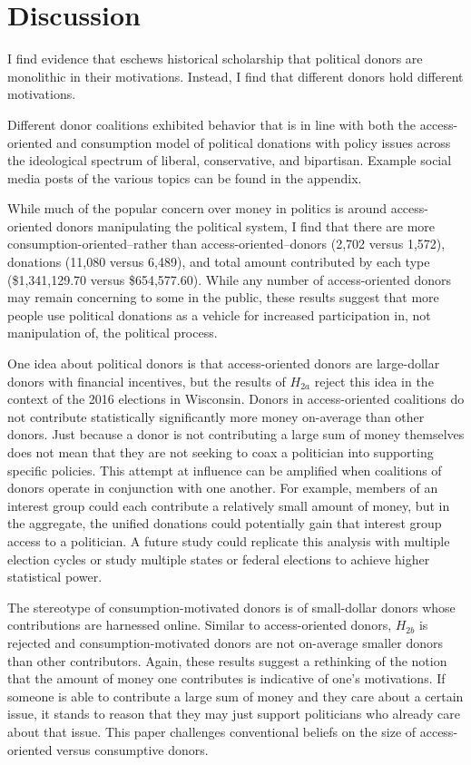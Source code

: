 \documentclass[12pt,]{article}
\begin{document}
\hypertarget{discussion}{%
\section{Discussion}\label{discussion}}

I find evidence that eschews historical scholarship that political
donors are monolithic in their motivations. Instead, I find that
different donors hold different motivations.

Different donor coalitions exhibited behavior that is in line with both
the access-oriented and consumption model of political donations with
policy issues across the ideological spectrum of liberal, conservative,
and bipartisan. Example social media posts of the various topics can be
found in the appendix.

While much of the popular concern over money in politics is around
access-oriented donors manipulating the political system, I find that
there are more consumption-oriented--rather than access-oriented--donors
(2,702 versus 1,572), donations (11,080 versus 6,489), and total amount
contributed by each type (\$1,341,129.70 versus \$654,577.60). While any
number of access-oriented donors may remain concerning to some in the
public, these results suggest that more people use political donations
as a vehicle for increased participation in, not manipulation of, the
political process.

One idea about political donors is that access-oriented donors are
large-dollar donors with financial incentives, but the results of
\(H_{2a}\) reject this idea in the context of the 2016 elections in
Wisconsin. Donors in access-oriented coalitions do not contribute
statistically significantly more money on-average than other donors.
Just because a donor is not contributing a large sum of money themselves
does not mean that they are not seeking to coax a politician into
supporting specific policies. This attempt at influence can be amplified
when coalitions of donors operate in conjunction with one another. For
example, members of an interest group could each contribute a relatively
small amount of money, but in the aggregate, the unified donations could
potentially gain that interest group access to a politician. A future
study could replicate this analysis with multiple election cycles or
study multiple states or federal elections to achieve higher statistical
power.

The stereotype of consumption-motivated donors is of small-dollar donors
whose contributions are harnessed online. Similar to access-oriented
donors, \(H_{2b}\) is rejected and consumption-motivated donors are not
on-average smaller donors than other contributors. Again, these results
suggest a rethinking of the notion that the amount of money one
contributes is indicative of one's motivations. If someone is able to
contribute a large sum of money and they care about a certain issue, it
stands to reason that they may just support politicians who already care
about that issue. This paper challenges conventional beliefs on the size
of access-oriented versus consumptive donors.
\end{document}
